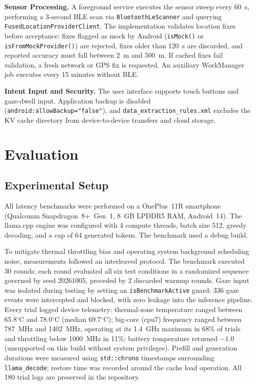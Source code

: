 \documentclass[conference]{IEEEtran}
\begin{document}
\textbf{Sensor Processing.}
A foreground service executes the sensor sweep every 60~s, performing a 3-second BLE scan via \texttt{BluetoothLeScanner} and querying \texttt{FusedLocationProviderClient}. The implementation validates location fixes before acceptance: fixes flagged as mock by Android (\texttt{isMock()} or \texttt{isFromMockProvider()}) are rejected, fixes older than 120~s are discarded, and reported accuracy must fall between 2~m and 500~m. If cached fixes fail validation, a fresh network or GPS fix is requested. An auxiliary WorkManager job executes every 15 minutes without BLE.

\textbf{Intent Input and Security.}
The user interface supports touch buttons and gaze-dwell input. Application backup is disabled (\texttt{android:allowBackup="false"}), and \texttt{data\_extraction\_rules.xml} excludes the KV cache directory from device-to-device transfers and cloud storage.

\section{Evaluation}
\label{sec:evaluation}

\subsection{Experimental Setup}
\label{sec:eval_setup}
All latency benchmarks were performed on a OnePlus~11R smartphone (Qualcomm Snapdragon~8+~Gen~1, 8~GB LPDDR5 RAM, Android~14). The llama.cpp engine was configured with 4 compute threads, batch size 512, greedy decoding, and a cap of 64 generated tokens. The benchmark used a debug build.

To mitigate thermal throttling bias and operating system background scheduling noise, measurements followed an interleaved protocol. The benchmark executed 30 rounds; each round evaluated all six test conditions in a randomized sequence governed by seed 20261005, preceded by 2 discarded warmup rounds. Gaze input was isolated during testing by setting an \texttt{isBenchmarkActive} guard: 336 gaze events were intercepted and blocked, with zero leakage into the inference pipeline. Every trial logged device telemetry: thermal-zone temperature ranged between 65.8$^\circ$C and 78.0$^\circ$C (median 69.7$^\circ$C); big-core (cpu7) frequency ranged between 787~MHz and 1402~MHz, operating at its 1.4~GHz maximum in 68\% of trials and throttling below 1000~MHz in 11\%; battery temperature returned $-1.0$ (unsupported on this build without system privileges). Prefill and generation durations were measured using \texttt{std::chrono} timestamps surrounding \texttt{llama\_decode}; restore time was recorded around the cache load operation. All 180 trial logs are preserved in the repository.
\end{document}
